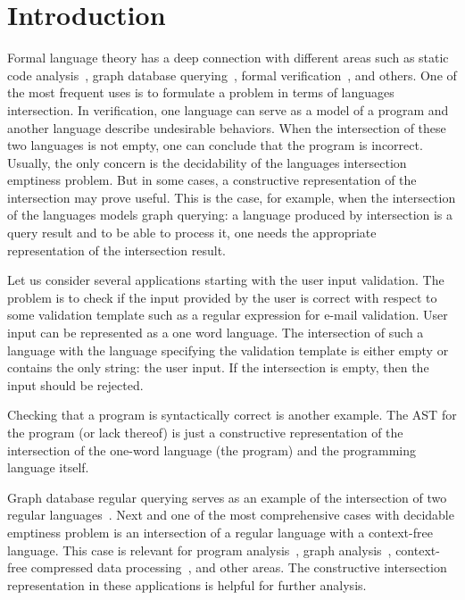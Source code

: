 \section{Introduction}

Formal language theory has a deep connection with different areas such as static code analysis~\cite{Reps:1995:PID:199448.199462,vardoulakis2010cfa2,Yan:2011:DCA:2001420.2001440,rehof2001type,lu2013incremental,pratikakis2006existential,zhang2017context}, graph database querying~\cite{hellingsRelational,hellingsPathQuerying,zhang2016context,koschmieder2012regular}, formal verification~\cite{10.1007/11730637_17,10.1007/3-540-63141-0_10}, and others.
One of the most frequent uses is to formulate a problem in terms of languages intersection.
In verification, one language can serve as a model of a program and another language describe undesirable behaviors.
When the intersection of these two languages is not empty, one can conclude that the program is incorrect.
Usually, the only concern is the decidability of the languages intersection emptiness problem.
But in some cases, a constructive representation of the intersection may prove useful.
This is the case, for example, when the intersection of the languages models graph querying: a language produced by intersection is a query result and to be able to process it, one needs the appropriate representation of the intersection result.

Let us consider several applications starting with the user input validation.
The problem is to check if the input provided by the user is correct with respect to some validation template such as a regular expression for e-mail validation.
User input can be represented as a one word language.
The intersection of such a language with the language specifying the validation template is either empty or contains the only string: the user input.
If the intersection is empty, then the input should be rejected.

Checking that a program is syntactically correct is another example.
The AST for the program (or lack thereof) is just a constructive representation of the intersection of the one-word language (the program) and the programming language itself.

Graph database regular querying serves as an example of the intersection of two regular languages~\cite{ABITEBOUL1999428,koschmieder2012regular,alkhateeb:tel-00293206}.
Next and one of the most comprehensive cases with decidable emptiness problem is an intersection of a regular language with a context-free language.
This case is relevant for program analysis~\cite{Reps:1995:PID:199448.199462,vardoulakis2010cfa2,Yan:2011:DCA:2001420.2001440}, graph analysis~\cite{hellingsPathQuerying,zhang2016context,grigorev2016context}, context-free compressed data processing~\cite{MANETH201819}, and other areas.
The constructive intersection representation in these applications is helpful for further analysis.

